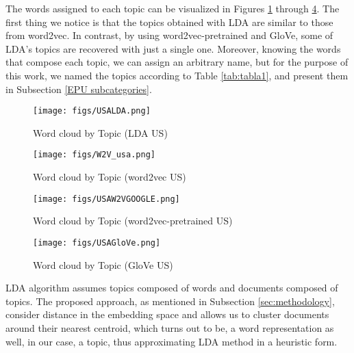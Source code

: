 \documentclass{article}
\begin{document}

The words assigned to each topic can be visualized in Figures \ref{fig:chap3.fig4} through \ref{fig:chap3.fig6}.  The first thing we notice is that the topics obtained with LDA are similar to those from word2vec. In contrast, by using word2vec-pretrained and GloVe,  some of LDA's topics are recovered with just a single one. Moreover, knowing the words that compose each topic, we can assign an arbitrary name, but for the purpose of this work, we named the topics according to Table \ref{tab:tabla1}, and present them in Subsection \ref{EPU subcategories}.

\begin{figure}[H]
    \centering
    \texttt{[image: figs/USALDA.png]}
    \caption{Word cloud by Topic (LDA US) }
    \label{fig:chap3.fig4}
\end{figure}

\begin{figure}[H]
  \centering
  \texttt{[image: figs/W2V\_usa.png]}
    \caption{Word cloud by Topic (word2vec US) }
  \label{fig:chap3.fig42}
\end{figure}


\begin{figure}[H]
  \centering
  \texttt{[image: figs/USAW2VGOOGLE.png]}
\caption{Word cloud by Topic (word2vec-pretrained US)}  \label{fig:chap3.fig5}
\end{figure}

\begin{figure}[H]
  \centering
  \texttt{[image: figs/USAGloVe.png]}
\caption{Word cloud by Topic (GloVe US)}  \label{fig:chap3.fig6}
\end{figure}

LDA algorithm assumes topics composed of words and documents composed of topics. The proposed approach, as mentioned in Subsection \ref{sec:methodology}, consider distance in the embedding space and allows us to cluster documents around their nearest centroid, which turns out to be, a word representation as well, in our case, a topic, thus approximating LDA method in a heuristic form. 
\end{document}
